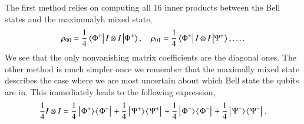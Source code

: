 \begin{solution}
\begin{enumerate}[label=(\alph*)]
    The first method relies on computing all 16 inner products between the Bell states and the maximmalyh mixed state,
    \begin{equation*}
        \rho_{00} = \frac{1}{4}\bra{\Phi^+} I\otimes I\ket{\Phi^+}, \quad \rho_{01} = \frac{1}{4}\bra{\Phi^+} I\otimes I\ket{\Psi^+}, \ldots .
    \end{equation*}
    We see that the only nonvanishing matrix coefficients are the diagonal ones.
    The other method is much simpler once we remember that the maximally mixed state describes the case where we are most uncertain about which Bell state the qubits are in.
    This immediately leads to the following expression,
    \begin{align*}
        \frac{1}{4}I\otimes I = \frac{1}{4}\left|\left. \Phi^+ \rangle\right.\!\langle\left. \Phi^+ \right|\right.  + \frac{1}{4}\left|\left. \Psi^+ \rangle\right.\!\langle\left. \Psi^+ \right|\right.  + \frac{1}{4}\left|\left. \Phi^- \rangle\right.\!\langle\left. \Phi^- \right|\right.  + \frac{1}{4}\left|\left. \Psi^- \rangle\right.\!\langle\left. \Psi^- \right|\right. .
    \end{align*}
\end{enumerate}
\end{solution}

